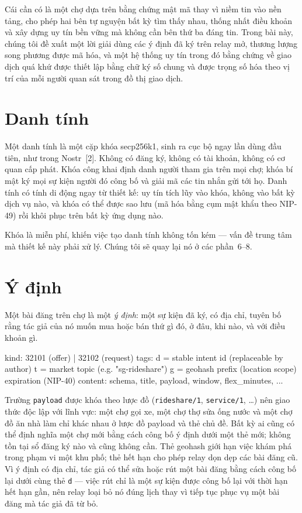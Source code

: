 \documentclass[11pt]{article}
\begin{document}
Cái cần có là một chợ dựa trên bằng chứng mật mã thay vì niềm tin vào nền
tảng, cho phép hai bên tự nguyện bất kỳ tìm thấy nhau, thống nhất điều khoản
và xây dựng uy tín bền vững mà không cần bên thứ ba đáng tin. Trong bài này,
chúng tôi đề xuất một lời giải dùng các ý định đã ký trên relay mở, thương
lượng song phương được mã hóa, và một hệ thống uy tín trong đó bằng chứng về
giao dịch quá khứ được thiết lập bằng chữ ký số chung và được trọng số hóa
theo vị trí của mỗi người quan sát trong đồ thị giao dịch.

\section{Danh tính}

Một danh tính là một cặp khóa secp256k1, sinh ra cục bộ ngay lần dùng đầu
tiên, như trong Nostr~[2]. Không có đăng ký, không có tài khoản, không có cơ
quan cấp phát. Khóa công khai định danh người tham gia trên mọi chợ; khóa bí
mật ký mọi sự kiện người đó công bố và giải mã các tin nhắn gửi tới họ. Danh
tính có tính di động ngay từ thiết kế: uy tín tích lũy vào khóa, không vào bất
kỳ dịch vụ nào, và khóa có thể được sao lưu (mã hóa bằng cụm mật khẩu theo
NIP-49) rồi khôi phục trên bất kỳ ứng dụng nào.

Khóa là miễn phí, khiến việc tạo danh tính không tốn kém --- vấn đề trung tâm
mà thiết kế này phải xử lý. Chúng tôi sẽ quay lại nó ở các phần~6--8.

\section{Ý định}

Một bài đăng trên chợ là một \emph{ý định}: một sự kiện đã ký, có địa chỉ,
tuyên bố rằng tác giả của nó muốn mua hoặc bán thứ gì đó, ở đâu, khi nào, và
với điều khoản gì.

\begin{code}
kind:  32101 (offer) | 32102 (request)
tags:  d = stable intent id          (replaceable by author)
       t = market topic              (e.g. "sg-rideshare")
       g = geohash prefix            (location scope)
       expiration                    (NIP-40)
content: { schema, title, payload, window, flex_minutes, ... }
\end{code}

Trường \texttt{payload} được khóa theo lược đồ (\texttt{rideshare/1},
\texttt{service/1}, \dots) nên giao thức độc lập với lĩnh vực: một chợ gọi xe,
một chợ thợ sửa ống nước và một chợ đồ ăn nhà làm chỉ khác nhau ở lược đồ
payload và thẻ chủ đề. Bất kỳ ai cũng có thể định nghĩa một chợ mới bằng cách
công bố ý định dưới một thẻ mới; không tồn tại sổ đăng ký nào và cũng không
cần. Thẻ geohash giới hạn việc khám phá trong phạm vi một khu phố; thẻ hết
hạn cho phép relay dọn dẹp các bài đăng cũ. Vì ý định có địa chỉ, tác giả có
thể sửa hoặc rút một bài đăng bằng cách công bố lại dưới cùng thẻ \texttt{d}
--- việc rút chỉ là một sự kiện được công bố lại với thời hạn hết hạn gần, nên
relay loại bỏ nó đúng lịch thay vì tiếp tục phục vụ một bài đăng mà tác giả
đã từ bỏ.
\end{document}
